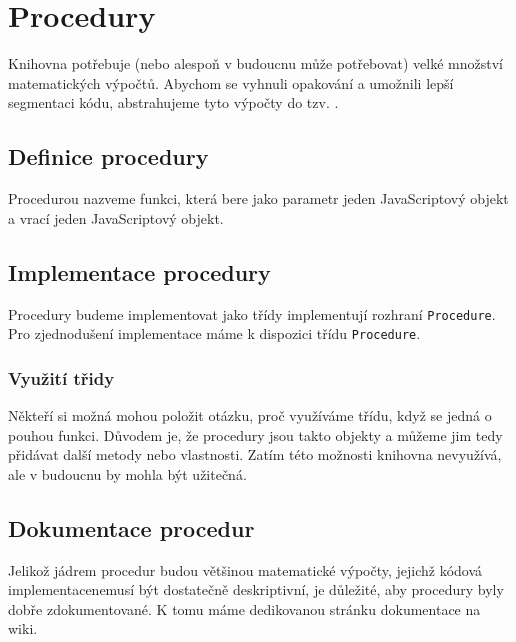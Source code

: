 \chapter{Procedury}
\label{chap:procedures}

Knihovna potřebuje (nebo alespoň v budoucnu může potřebovat) velké množství matematických výpočtů.
Abychom se vyhnuli opakování a umožnili lepší segmentaci kódu, abstrahujeme tyto výpočty do tzv. \cite{geometryjs:wiki:procedures}.

\section[Definice]{Definice procedury}
\label{sec:procedure-definition}

Procedurou nazveme  funkci, která bere jako parametr jeden JavaScriptový objekt a vrací jeden JavaScriptový objekt\cite{geometryjs:wiki:procedures}.

\section[Implementace]{Implementace procedury}
\label{sec:procedure-implementation}

Procedury budeme implementovat jako třídy implementují rozhraní \texttt{Procedure}\cite{geometryjs:source:interfaces:procedure.ts}.
Pro zjednodušení implementace máme k dispozici třídu \texttt{Procedure}\cite{geometryjs:source:procedures:procedure.ts}.

\subsection{Využití třidy}
\label{subsec:procedure-usage-of-class}

Někteří si možná mohou položit otázku, proč využíváme třídu, když se jedná o pouhou funkci.
Důvodem je, že procedury jsou takto objekty a můžeme jim tedy přidávat další metody nebo vlastnosti.
Zatím této možnosti knihovna nevyužívá\cite{geometryjs:source:procedures:procedure.ts}, ale v budoucnu by mohla být užitečná.

\section[Dokumentace]{Dokumentace procedur}
\label{sec:procedure-documentation}

Jelikož jádrem procedur budou většinou matematické výpočty, jejichž kódová implementacenemusí být dostatečně deskriptivní, je důležité, aby procedury byly dobře zdokumentované.
K tomu máme dedikovanou stránku dokumentace na wiki\cite{geometryjs:wiki:procedures}.

